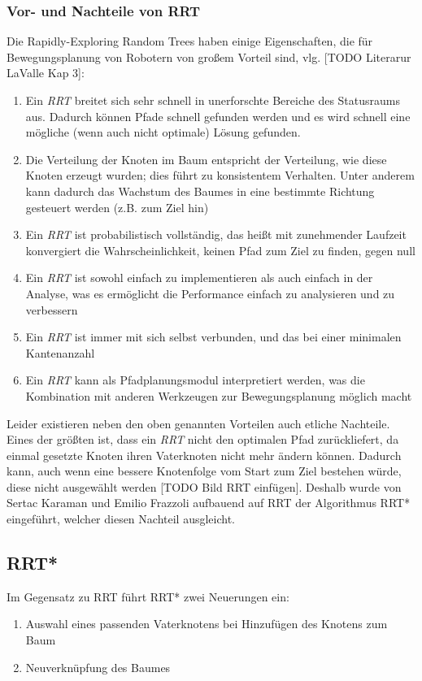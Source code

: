 \subsubsection{Vor- und Nachteile von RRT}
Die Rapidly-Exploring Random Trees haben einige Eigenschaften, die für Bewegungsplanung von Robotern von großem Vorteil sind, vlg. [TODO Literarur LaValle Kap 3]:
\begin{enumerate}
\item Ein \textit{RRT} breitet sich sehr schnell in unerforschte Bereiche des Statusraums aus. Dadurch können Pfade schnell gefunden werden und es wird schnell eine mögliche (wenn auch nicht optimale) Lösung gefunden.
\item Die Verteilung der Knoten im Baum entspricht der Verteilung, wie diese Knoten erzeugt wurden; dies führt zu konsistentem Verhalten. Unter anderem kann dadurch das Wachstum des Baumes in eine bestimmte Richtung gesteuert werden (z.B. zum Ziel hin)
\item Ein \textit{RRT} ist probabilistisch vollständig, das heißt mit zunehmender Laufzeit konvergiert die Wahrscheinlichkeit, keinen Pfad zum Ziel zu finden, gegen null
\item Ein \textit{RRT} ist sowohl einfach zu implementieren als auch einfach in der Analyse, was es ermöglicht die Performance einfach zu analysieren und zu verbessern
\item Ein \textit{RRT} ist immer mit sich selbst verbunden, und das bei einer minimalen Kantenanzahl
\item Ein \textit{RRT} kann als Pfadplanungsmodul interpretiert werden, was die Kombination mit anderen Werkzeugen zur Bewegungsplanung möglich macht
\end{enumerate}
Leider existieren neben den oben genannten Vorteilen auch etliche Nachteile. Eines der größten ist, dass ein \textit{RRT} nicht den optimalen Pfad zurückliefert, da einmal gesetzte Knoten ihren Vaterknoten nicht mehr ändern können. Dadurch kann, auch wenn eine bessere Knotenfolge vom Start zum Ziel bestehen würde, diese nicht ausgewählt werden [TODO Bild RRT einfügen]. Deshalb wurde von Sertac Karaman und Emilio Frazzoli aufbauend auf RRT der Algorithmus RRT* eingeführt, welcher diesen Nachteil ausgleicht.
\subsection{RRT*}
Im Gegensatz zu RRT führt RRT* zwei Neuerungen ein:
\begin{enumerate}
\item Auswahl eines passenden Vaterknotens bei Hinzufügen des Knotens zum Baum
\item Neuverknüpfung des Baumes
\end{enumerate}

